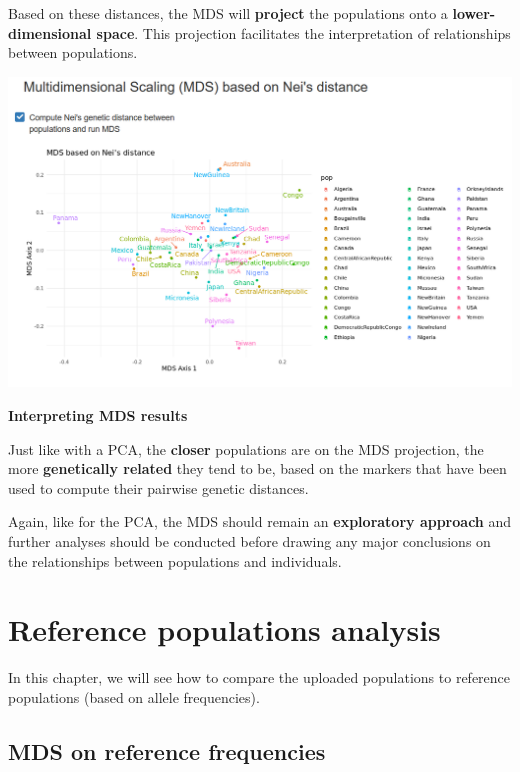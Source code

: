 \documentclass[
]{book}
\begin{document}
Based on these distances, the MDS will \textbf{project} the populations onto a
\textbf{lower-dimensional space}. This projection facilitates the interpretation of
relationships between populations.

\includegraphics[width=1\linewidth]{img/capture_mds_1}

\begin{interpretation}
\textbf{Interpreting MDS results}

Just like with a PCA, the \textbf{closer} populations are on the MDS projection,
the more \textbf{genetically related} they tend to be, based on the markers that have been
used to compute their pairwise genetic distances.

Again, like for the PCA, the MDS should remain an
\textbf{exploratory approach} and further analyses should be conducted before drawing
any major conclusions on the relationships between populations and individuals.

\end{interpretation}

\hypertarget{ref-pop}{%
\chapter{Reference populations analysis}\label{ref-pop}}

In this chapter, we will see how to compare the uploaded populations to
reference populations (based on allele frequencies).

\hypertarget{mds-on-reference-frequencies}{%
\section{MDS on reference frequencies}\label{mds-on-reference-frequencies}}
\end{document}
